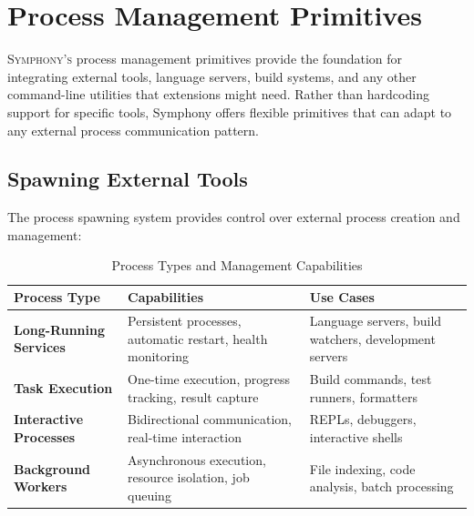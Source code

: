 
\section*{Process Management Primitives}

\vspace{0.5cm}
\lettrine{S}{ymphony's} process management primitives provide the foundation for integrating external tools, language servers, build systems, and any other command-line utilities that extensions might need. Rather than hardcoding support for specific tools, Symphony offers flexible primitives that can adapt to any external process communication pattern.

\subsection*{Spawning External Tools}

The process spawning system provides control over external process creation and management:

\begin{table}[ht]
\centering
\begin{tabular}{@{}p{}p{}p{}@{}}
\toprule
\textbf{Process Type} & \textbf{Capabilities} & \textbf{Use Cases} \\
\midrule
\textbf{Long-Running Services} & 
Persistent processes, automatic restart, health monitoring & 
Language servers, build watchers, development servers \\
\midrule
\textbf{Task Execution} & 
One-time execution, progress tracking, result capture & 
Build commands, test runners, formatters \\
\midrule
\textbf{Interactive Processes} & 
Bidirectional communication, real-time interaction & 
REPLs, debuggers, interactive shells \\
\midrule
\textbf{Background Workers} & 
Asynchronous execution, resource isolation, job queuing & 
File indexing, code analysis, batch processing \\
\bottomrule
\end{tabular}
\caption{Process Types and Management Capabilities}
\end{table}

